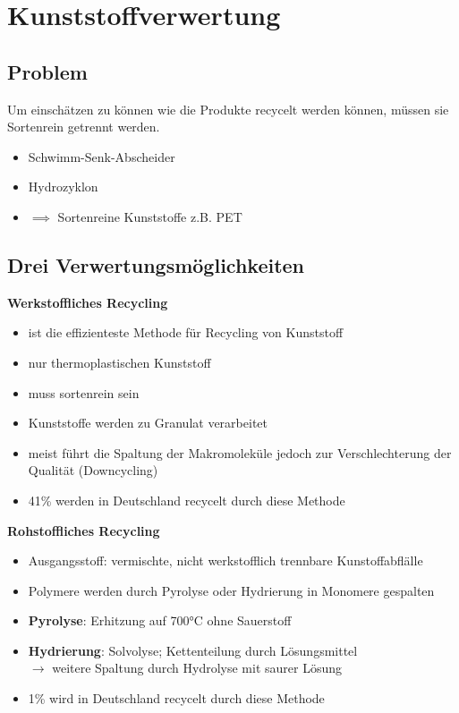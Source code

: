
\section{Kunststoffverwertung}
\subsection{Problem}
Um einschätzen zu können wie die Produkte recycelt werden können,
müssen sie Sortenrein getrennt werden.
\begin{itemize}
    \item Schwimm-Senk-Abscheider
    \item Hydrozyklon
    \item $\implies$ Sortenreine Kunststoffe z.B. PET
\end{itemize}

\subsection{Drei Verwertungsmöglichkeiten}

\setlength{\columnsep}{1cm}
\setlength{\columnseprule}{0.4pt}
\begin{multicols}{2}

    \textbf{Werkstoffliches Recycling} 
    \begin{itemize}
        \item ist die effizienteste Methode für Recycling von Kunststoff
        \item nur thermoplastischen Kunststoff
        \item muss sortenrein sein
        \item Kunststoffe werden zu Granulat verarbeitet
        \item meist führt die Spaltung der Makromoleküle jedoch zur Verschlechterung der Qualität (Downcycling)
        \item 41\% werden in Deutschland recycelt durch diese Methode
    \end{itemize}

    \columnbreak

    \textbf{Rohstoffliches Recycling} 
    \begin{itemize}
        \item Ausgangsstoff: vermischte, nicht werkstofflich trennbare Kunstoffabflälle
        \item Polymere werden durch Pyrolyse oder Hydrierung in Monomere gespalten
        \item \textbf{Pyrolyse}: Erhitzung auf 700°C ohne Sauerstoff
        \item \textbf{Hydrierung}: Solvolyse; Kettenteilung durch Lösungsmittel \\
            $\rightarrow$ weitere Spaltung durch Hydrolyse mit saurer Lösung
        \item 1\% wird in Deutschland recycelt durch diese Methode
    \end{itemize}

\end{multicols}

